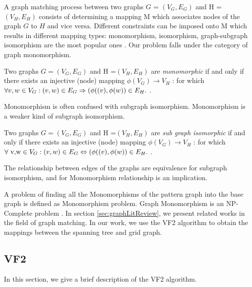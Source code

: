 A graph matching process between two graphs $G$ = $(V_G,E_G)$ and H = $(V_H,E_H)$ consists of determining a mapping M which associates nodes of the graph $G$ to $H$ and vice versa. Different constraints can be imposed onto M which results in different mapping types: monomorphism, isomorphism, graph-subgraph isomorphism are the most popular ones \cite{cordella1999performance}. Our problem falls under the category of graph monomorphism. 

Two graphs 
 $G =( V_G, E_G)$ and
 H =$( V_H, E_H)$  are \textit{monomorphic}  if and only if there exists an injective (node)
mapping $\phi (V_G) \rightarrow  V_H$ : for which $\forall v,w \in V_G:(v,w) \in E_G \Rightarrow (\phi((v),\space \phi(w)) \in E_H.$ \cite{singler2005graph}.

Monomorphism is often confused with subgraph isomorphism. Monomorphism is a weaker kind of subgraph isomorphism.

Two graphs  $G =( V_G, E_G)$ and
 H =$( V_H, E_H)$  are \textit{sub graph isomorphic}  if and only if there exists an injective (node)
mapping $\phi( V_G) \rightarrow  V_H$ : for which $\forall \text{ v,w} \in V_G:(v,w) \in E_G \Leftrightarrow (\phi((v),\space \phi(w)) \in E_H.$ \cite{singler2005graph}.

The relationship between edges of the graphs are equivalence for subgraph isomorphism, and for Monomorphism  relationship  is an implication.

A problem of finding all the Monomorphisms of the pattern graph into the base graph is defined as Monomorphism problem. Graph Monomorphism is an NP-Complete problem \cite{Garey:1979:CIG:578533}.  In section \ref{sec:graphLitReview}, we present related works in the field of graph matching. In our work, we use the VF2 algorithm to obtain the mappings between the spanning tree and grid graph.

\subsection{VF2}

In this section, we give a brief description of the VF2 algorithm.

